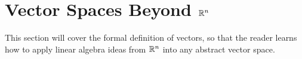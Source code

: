 \section{Vector Spaces Beyond $\Rs[n]$}
This section will cover the formal definition of vectors, so that the reader learns how to apply linear algebra ideas from $\Rs[n]$ into any abstract vector space.

%
%
%
